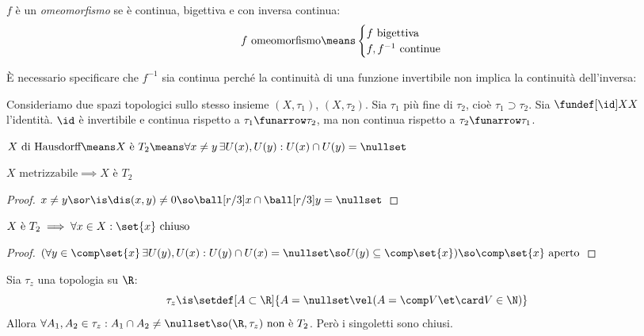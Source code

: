 \begin{defn}[Omeomorfismo]
	$f$ è un \emph{omeomorfismo} se è continua, bigettiva e con inversa continua:
	\[f\text{ omeomorfismo}\means
	\begin{cases}
		f\text{ bigettiva }\\
		f, f^{-1}\text{ continue}
	\end{cases}\]
\end{defn}

È necessario specificare che $f^{-1}$ sia continua perché la continuità di una funzione invertibile non implica la continuità dell'inversa:

\begin{es}
	Consideriamo due spazi topologici sullo stesso insieme $(X,\tau_1)$, $(X,\tau_2)$.
	Sia $\tau_1$ più fine di $\tau_2$, cioè $\tau_1\supset\tau_2$.
	Sia $\fundef[\id]XX$ l'identità.
	$\id$ è invertibile e continua rispetto a $\tau_1\funarrow\tau_2$,
	ma non continua rispetto a $\tau_2\funarrow\tau_1$.
\end{es}


\begin{defn}
$X\text{ di Hausdorff}\means X\text{ è }T_2\means\forall x\neq y\,\exists U(x),U(y):U(x)\cap U(y)=\nullset$
\end{defn}

\begin{prop}
$X\text{ metrizzabile}\implies X\text{ è }T_2$
\end{prop}
\begin{proof}
$x\neq y\so r\is\dis(x,y)\neq 0\so\ball[r/3]x\cap\ball[r/3]y=\nullset$
\end{proof}

\begin{prop}
$X\text{ è }T_2\implies\forall x\in X:\set{x}\text{ chiuso}$
\end{prop}
\begin{proof}
$(\forall y\in\comp\set{x}\,\exists U(y),U(x):U(y)\cap U(x)=\nullset\so U(y)\subseteq\comp\set{x})\so\comp\set{x}\text{ aperto}$
\end{proof}

\begin{es}
Sia $\tau_z$ una topologia su $\R$:
\[\tau_z\is\setdef[A\subset\R]{A=\nullset\vel(A=\comp V\et\card V\in\N)}\]
Allora $\forall A_1,A_2\in\tau_z:A_1\cap A_2\neq\nullset\so(\R,\tau_z)\text{ non è }T_2$. Però i singoletti sono chiusi.
\end{es}

